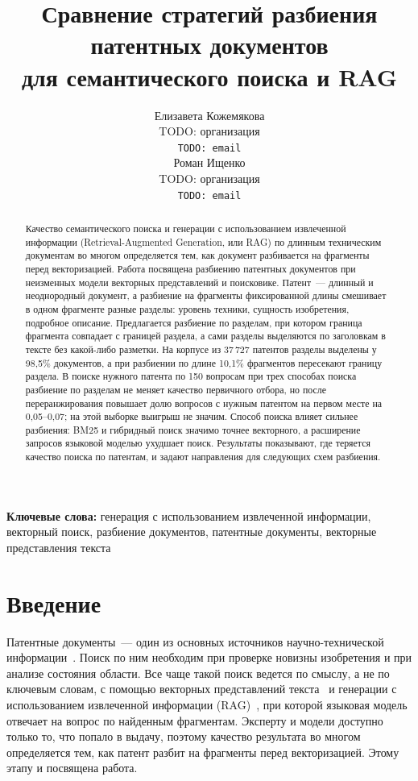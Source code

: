 \documentclass{article}
\title{Сравнение стратегий разбиения патентных документов\\для семантического поиска и RAG}
\author{
  Елизавета Кожемякова\\
  TODO: организация\\
  \texttt{TODO: email}\\
  \And
  Роман Ищенко\\
  TODO: организация\\
  \texttt{TODO: email}\\
}
\begin{document}
\maketitle

\begin{abstract}
Качество семантического поиска и генерации с использованием извлеченной информации (Retrieval-Augmented Generation, или RAG) по длинным техническим документам во многом определяется тем, как документ разбивается на фрагменты перед векторизацией. Работа посвящена разбиению патентных документов при неизменных модели векторных представлений и поисковике. Патент~--- длинный и неоднородный документ, а разбиение на фрагменты фиксированной длины смешивает в одном фрагменте разные разделы: уровень техники, сущность изобретения, подробное описание. Предлагается разбиение по разделам, при котором граница фрагмента совпадает с границей раздела, а сами разделы выделяются по заголовкам в тексте без какой-либо разметки. На корпусе из 37\,727 патентов разделы выделены у 98,5\% документов, а при разбиении по длине 10,1\% фрагментов пересекают границу раздела. В поиске нужного патента по 150 вопросам при трех способах поиска разбиение по разделам не меняет качество первичного отбора, но после переранжирования повышает долю вопросов с нужным патентом на первом месте на 0,05--0,07; на этой выборке выигрыш не значим. Способ поиска влияет сильнее разбиения: BM25 и гибридный поиск значимо точнее векторного, а расширение запросов языковой моделью ухудшает поиск. Результаты показывают, где теряется качество поиска по патентам, и задают направления для следующих схем разбиения.
\end{abstract}

\textbf{Ключевые слова:} генерация с использованием извлеченной информации, векторный поиск, разбиение документов, патентные документы, векторные представления текста

\section{Введение}\label{sec:intro}

Патентные документы~--- один из основных источников научно-технической информации~\citep{jiang2025patentsurvey}. Поиск по ним необходим при проверке новизны изобретения и при анализе состояния области. Все чаще такой поиск ведется по смыслу, а не по ключевым словам, с помощью векторных представлений текста~\citep{reimers2019sbert,karpukhin2020dpr} и генерации с использованием извлеченной информации (RAG)~\citep{lewis2020rag}, при которой языковая модель отвечает на вопрос по найденным фрагментам. Эксперту и модели доступно только то, что попало в выдачу, поэтому качество результата во многом определяется тем, как патент разбит на фрагменты перед векторизацией. Этому этапу и посвящена работа.
\end{document}
